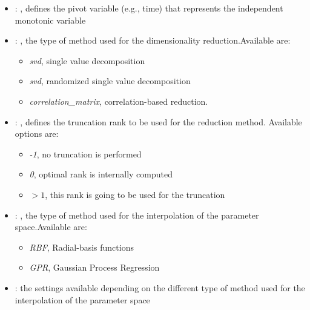 \begin{itemize}
    \item {}: , 
      defines the pivot variable (e.g., time) that represents the
      independent monotonic variable

    \item {}: , 
      the type of method used for the dimensionality reduction.Available are:
      \begin{itemize}                                                     \item \textit{svd}, single
      value decomposition                                                     \item \textit{svd},
      randomized single value decomposition
      \item \textit{correlation\_matrix}, correlation-based reduction.
      \end{itemize}

    \item {}: , 
      defines the truncation rank to be used for the reduction method.
      Available options are:                                                  \begin{itemize}
      \item \textit{-1}, no truncation is performed
      \item \textit{0}, optimal rank is internally computed
      \item \textit{$>1$}, this rank is going to be used for the truncation
      \end{itemize}

    \item {}: , 
      the type of method used for the interpolation of the parameter space.Available are:
      \begin{itemize}                                                     \item \textit{RBF},
      Radial-basis functions                                                     \item \textit{GPR},
      Gaussian Process Regression                                                   \end{itemize}

    \item {}:
      the settings available depending on the different type of method used for the interpolation of
      the parameter space


\end{itemize}
